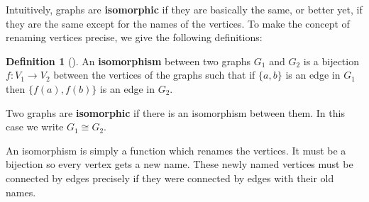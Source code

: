 \documentclass[10pt,]{book}
\newcommand{\terminology}[1]{\textbf{#1}}
\theoremstyle{plain}
\theoremstyle{definition}
\newtheorem{definition}[theorem]{Definition}
\theoremstyle{definition}
\theoremstyle{definition}
\numberwithin{equation}{chapter}
\def\isom{\cong}
\begin{document}
\hypertarget{p-52}{}%
Intuitively, graphs are \terminology{isomorphic}  if they are basically the same, or better yet, if they are the same except for the names of the vertices. To make the concept of renaming vertices precise, we give the following definitions:%
\begin{definition}[{}]\label{definition-2}
\hypertarget{p-53}{}%
 An \terminology{isomorphism} between two graphs \(G_1\) and \(G_2\) is a bijection \(f:V_1 \to V_2\) between the vertices of the graphs such that if \(\{a,b\}\) is an edge in \(G_1\) then \(\{f(a), f(b)\}\) is an edge in \(G_2\).%
\par
\hypertarget{p-54}{}%
Two graphs are \terminology{isomorphic} if there is an isomorphism between them. In this case we write \(G_1 \isom G_2\).%
\end{definition}
\hypertarget{p-55}{}%
An isomorphism is simply a function which renames the vertices. It must be a bijection so every vertex gets a new name. These newly named vertices must be connected by edges precisely if they were connected by edges with their old names.%
\end{document}
